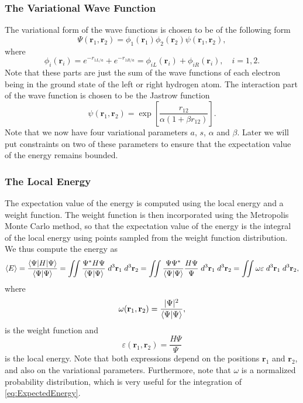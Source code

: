 \documentclass[twoside]{article}
\newcommand{\bfr}{\ensuremath{\mathbf{r}}}
\begin{document}
\subsubsection*{The Variational Wave Function}
The variational form of the wave functions is chosen to be of the following form
\begin{equation}
\Psi(\bfr_1,\bfr_2) = \phi_1(\bfr_1)\phi_2(\bfr_2)\psi(\bfr_1,\bfr_2),
\end{equation}
where 
\begin{equation}
\phi_i(\bfr_i) = e^{-r_{1L/a}} + e^{-r_{1R/a}} = \phi_{iL}(\bfr_i) + \phi_{iR}(\bfr_i), \quad i=1,2.
\end{equation}
Note that these parts are just the sum of the wave functions of each electron being in the ground state of the left or right hydrogen atom. The interaction part of the wave function is chosen to be the Jastrow function
\begin{equation}
\psi(\bfr_1,\bfr_2) = \exp\left[ \frac{r_{12}}{\alpha(1+\beta r_{12})} \right].
\end{equation}
Note that we now have four variational parameters $a$, $s$, $\alpha$ and $\beta$. Later we will put constraints on two of these parameters to ensure that the expectation value of the energy remains bounded.

\subsubsection*{The Local Energy}
The expectation value of the energy is computed using the local energy and a weight function. The weight function is then incorporated using the Metropolis Monte Carlo method, so that the expectation value of the energy is the integral of the local energy using points sampled from the weight function distribution. We thus compute the energy as
\begin{equation}
\braket{E} = \frac{\braket{\Psi|H|\Psi}}{\braket{\Psi|\Psi}} = 
\iint \frac{\Psi^* H \Psi}{\braket{\Psi|\Psi}}  \; d^3\bfr_1 \; d^3\bfr_2 = 
\iint \frac{\Psi\Psi^*}{\braket{\Psi|\Psi}} \frac{H \Psi}{\Psi} \; d^3\bfr_1 \; d^3\bfr_2 = \iint \omega \varepsilon \; d^3\bfr_1 \; d^3\bfr_2,
\label{eq:ExpectedEnergy}
\end{equation} 
where
\begin{equation}
\omega(\bfr_1,\bfr_2) = \frac{|\Psi|^2}{\braket{\Psi|\Psi}},
\end{equation}
is the weight function and
\begin{equation}
\varepsilon(\bfr_1,\bfr_2) = \frac{H \Psi}{\Psi}
\label{eq:LocalEnergy}
\end{equation}
is the local energy. Note that both expressions depend on the positions $\bfr_1$ and $\bfr_2$, and also on the variational parameters. Furthermore, note that $\omega$ is a normalized probability distribution, which is very useful for the integration of \eqref{eq:ExpectedEnergy}.
\end{document}
